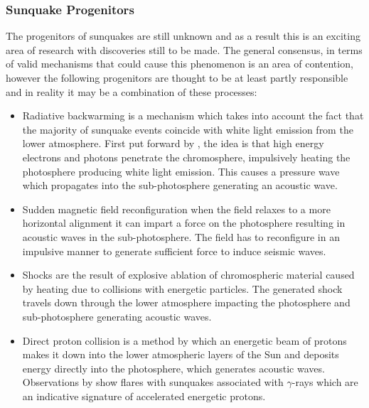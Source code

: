 \subsubsection{Sunquake Progenitors}

The progenitors of sunquakes are still unknown and as a result this is an exciting area of research with discoveries still to be made. The general consensus, in terms of valid mechanisms that could cause this phenomenon is an area of contention, however the following progenitors are thought to be at least partly responsible and in reality it may be a combination of these processes: 

\begin{itemize}
\item Radiative backwarming \citep{1989SoPh..124..303M} is a mechanism which takes into account the fact that the majority of sunquake events coincide with white light emission from the lower atmosphere. First put forward by \cite{2005ApJ...630.1168D}, the idea is that high energy electrons and photons penetrate the chromosphere, impulsively heating the photosphere producing white light emission. This causes a pressure wave which propagates into the sub-photosphere generating an acoustic wave. 
     
\item Sudden magnetic field reconfiguration \citep{2008ASPC..383..221H} when the field relaxes to a more horizontal alignment it can impart a force on the photosphere resulting in acoustic waves in the sub-photosphere. The field has to reconfigure in an impulsive manner to generate sufficient force to induce seismic waves. 

\item Shocks \citep{1998Natur.393..317K} are the result of explosive ablation of chromospheric material caused by heating due to collisions with energetic particles. The generated shock travels down through the lower atmosphere impacting the photosphere and sub-photosphere generating acoustic waves.  

\item Direct proton collision is a method by which an energetic beam of protons makes it down into the lower atmospheric layers of the Sun and deposits energy directly into the photosphere, which generates acoustic waves. Observations by \cite{2007ApJ...664..573Z} show flares with sunquakes associated with $\gamma$-rays which are an indicative signature of accelerated energetic protons.
\end{itemize}
